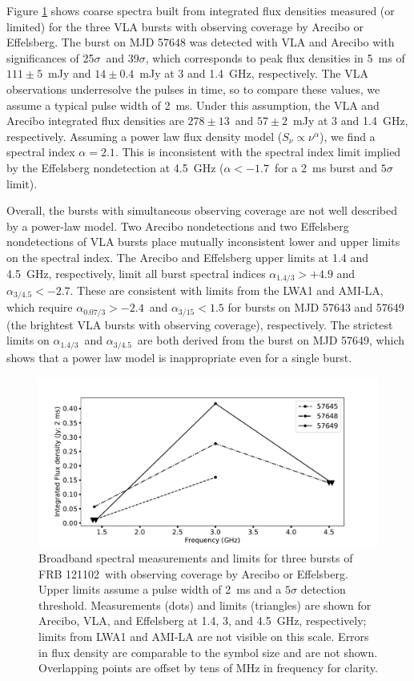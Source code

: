 \documentclass[twocolumn]{aastex61}
\newcommand{\frb}{FRB 121102}
\begin{document}
Figure \ref{fig:multi} shows coarse spectra built from integrated flux densities measured (or limited) for the three VLA bursts with observing coverage by Arecibo or Effelsberg. The burst on MJD 57648 was detected with VLA and Arecibo with significances of 25$\sigma$\ and 39$\sigma$, which corresponds to peak flux densities in 5~ms of $111\pm5$\ mJy and $14\pm0.4$\ mJy at 3 and 1.4~GHz, respectively. The VLA observations underresolve the pulses in time, so to compare these values, we assume a typical pulse width of 2~ms. Under this assumption, the VLA and Arecibo integrated flux densities are $278\pm13$\ and $57\pm2$\ mJy at 3 and 1.4~GHz, respectively. Assuming a power law flux density model ($S_{\nu} \propto \nu^{\alpha}$), we find a spectral index $\alpha=2.1$. This is inconsistent with the spectral index limit implied by the Effelsberg nondetection at 4.5~GHz ($\alpha<-1.7$\ for a 2~ms burst and $5\sigma$ limit).

Overall, the bursts with simultaneous observing coverage are not well described by a power-law model. Two Arecibo nondetections and two Effelsberg nondetections of VLA bursts place mutually inconsistent lower and upper limits on the spectral index. The Arecibo and Effelsberg upper limits at 1.4 and 4.5~GHz, respectively, limit all burst spectral indices $\alpha_{1.4/3}>+4.9$ and $\alpha_{3/4.5}<-2.7$. These are consistent with limits from the LWA1 and AMI-LA, which require $\alpha_{0.07/3}>-2.4$\ and $\alpha_{3/15}<1.5$ for bursts on MJD 57643 and 57649 (the brightest VLA bursts with observing coverage), respectively. The strictest limits on $\alpha_{1.4/3}$\ and $\alpha_{3/4.5}$\ are both derived from the burst on MJD 57649, which shows that a power law model is inappropriate even for a single burst.

\begin{figure}[htb]
\begin{center}
 \includegraphics[width=\columnwidth]{multispec.pdf}
 \caption{Broadband spectral measurements and limits for three bursts of \frb\ with observing coverage by Arecibo or Effelsberg. Upper limits assume a pulse width of 2~ms and a $5\sigma$ detection threshold. Measurements (dots) and limits (triangles) are shown for Arecibo, VLA, and Effelsberg at 1.4, 3, and 4.5~GHz, respectively; limits from LWA1 and AMI-LA are not visible on this scale. Errors in flux density are comparable to the symbol size and are not shown. Overlapping points are offset by tens of MHz in frequency for clarity.
 \label{fig:multi}}
\end{center}
\end{figure}
\end{document}
